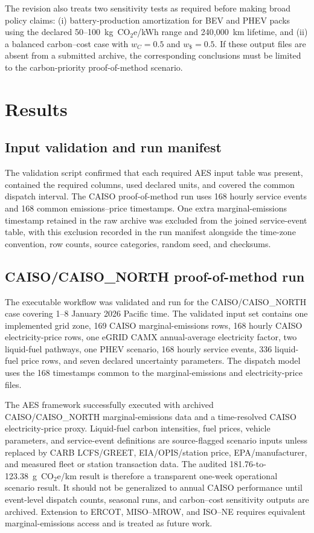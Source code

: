 \documentclass[cleantechnol,article,submit,pdftex,moreauthors]{Definitions/mdpi}
\newcommand{\gcoeqkm}{g~CO$_2$e/km}
\begin{document}
The revision also treats two sensitivity tests as required before making broad policy claims: (i) battery-production amortization for BEV and PHEV packs using the declared 50--100~kg~CO$_2$e/kWh range and 240,000~km lifetime, and (ii) a balanced carbon--cost case with $w_C=0.5$ and $w_\$=0.5$. If these output files are absent from a submitted archive, the corresponding conclusions must be limited to the carbon-priority proof-of-method scenario.


\section{Results}
\label{sec:results}

\subsection{Input validation and run manifest}
\label{subsec:input_validation}

The validation script confirmed that each required AES input table was present, contained the required columns, used declared units, and covered the common dispatch interval. The CAISO proof-of-method run uses 168 hourly service events and 168 common emissions--price timestamps. One extra marginal-emissions timestamp retained in the raw archive was excluded from the joined service-event table, with this exclusion recorded in the run manifest alongside the time-zone convention, row counts, source categories, random seed, and checksums.


\subsection{CAISO/CAISO\_NORTH proof-of-method run}
\label{subsec:caiso_run}

The executable workflow was validated and run for the CAISO/CAISO\_NORTH case covering 1--8 January 2026 Pacific time. The validated input set contains one implemented grid zone, 169 CAISO marginal-emissions rows, 168 hourly CAISO electricity-price rows, one eGRID CAMX annual-average electricity factor, two liquid-fuel pathways, one PHEV scenario, 168 hourly service events, 336 liquid-fuel price rows, and seven declared uncertainty parameters. The dispatch model uses the 168 timestamps common to the marginal-emissions and electricity-price files.

The AES framework successfully executed with archived CAISO/CAISO\_NORTH marginal-emissions data and a time-resolved CAISO electricity-price proxy. Liquid-fuel carbon intensities, fuel prices, vehicle parameters, and service-event definitions are source-flagged scenario inputs unless replaced by CARB LCFS/GREET, EIA/OPIS/station price, EPA/manufacturer, and measured fleet or station transaction data. The audited 181.76-to-123.38~\gcoeqkm{} result is therefore a transparent one-week operational scenario result. It should not be generalized to annual CAISO performance until event-level dispatch counts, seasonal runs, and carbon--cost sensitivity outputs are archived. Extension to ERCOT, MISO--MROW, and ISO--NE requires equivalent marginal-emissions access and is treated as future work.
\end{document}
